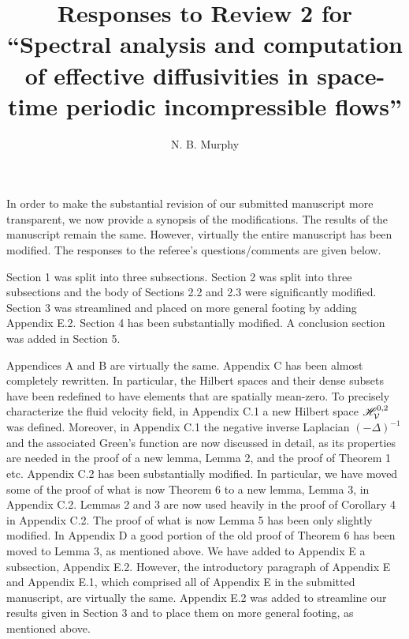 \documentclass[amsa]{article}
\begin{document}
\title{Responses to Review 2 for\\
  ``Spectral analysis and computation\\
  of effective diffusivities in 
  space-time periodic incompressible flows''}
\author{N. B. Murphy}

\maketitle

In order to make the substantial revision of our submitted manuscript
more transparent, we now provide a synopsis of the modifications. The 
results of the manuscript remain the same. However, virtually the
entire manuscript has been modified. The responses to the referee's
questions/comments are given below.   


Section 1 was split into three subsections. Section 2 was split into
three subsections and the body of Sections 2.2 and 2.3 were
significantly modified. Section 3 was streamlined and placed on more
general footing by adding Appendix E.2. Section 4 has been
substantially modified. A conclusion section was added in Section
5.


Appendices A and B are virtually the same.
Appendix C has been
almost completely rewritten. In particular, the Hilbert spaces and
their dense subsets have been redefined to have elements that are
spatially mean-zero. To precisely characterize the fluid velocity
field, in Appendix C.1 a new Hilbert space $\mathscr{H}_{\mathcal{V}}^{0,2}$ was
defined. Moreover, in Appendix C.1 the negative inverse Laplacian
$(-\Delta)^{-1}$ and the associated Green's function are now discussed in
detail, as its properties are needed 
in the proof of a new lemma, Lemma 2, and the proof of Theorem 1
etc. Appendix C.2 has been substantially modified. In particular, we
have moved some of the proof of what is now Theorem 6 to a new lemma,
Lemma 3, in Appendix C.2. Lemmas 2 and 3 are now used heavily in the
proof of Corollary 4 in Appendix C.2. The proof of what is now Lemma 5 
has been only slightly modified. In Appendix D a good portion of the
old proof of Theorem 6 has been moved to Lemma 3, as mentioned
above. We have added to Appendix E a subsection, Appendix
E.2. However, the introductory paragraph of Appendix E and Appendix
E.1, which comprised all of Appendix E in the submitted manuscript,
are virtually the same. Appendix E.2 was added to streamline our
results given in Section 3 and to place them on more general footing,
as mentioned above.   
\end{document}
